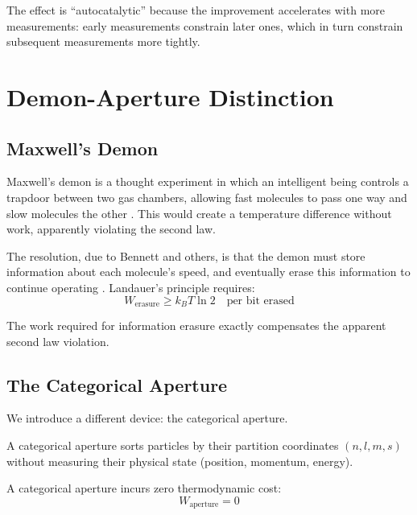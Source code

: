 The effect is ``autocatalytic'' because the improvement accelerates with more measurements: early measurements constrain later ones, which in turn constrain subsequent measurements more tightly.

\section{Demon-Aperture Distinction}
\label{sec:demon}

\subsection{Maxwell's Demon}

Maxwell's demon is a thought experiment in which an intelligent being controls a trapdoor between two gas chambers, allowing fast molecules to pass one way and slow molecules the other \cite{maxwell1871}. This would create a temperature difference without work, apparently violating the second law.

The resolution, due to Bennett and others, is that the demon must store information about each molecule's speed, and eventually erase this information to continue operating \cite{bennett1982}. Landauer's principle requires:
\begin{equation}
    W_{\text{erasure}} \geq k_B T \ln 2 \quad \text{per bit erased}
\end{equation}

The work required for information erasure exactly compensates the apparent second law violation.

\subsection{The Categorical Aperture}

We introduce a different device: the categorical aperture.

\begin{definition}
A categorical aperture sorts particles by their partition coordinates $(n, l, m, s)$ without measuring their physical state (position, momentum, energy).
\end{definition}

\begin{theorem}
\label{thm:aperture}
A categorical aperture incurs zero thermodynamic cost:
\begin{equation}
    W_{\text{aperture}} = 0
\end{equation}
\end{theorem}

